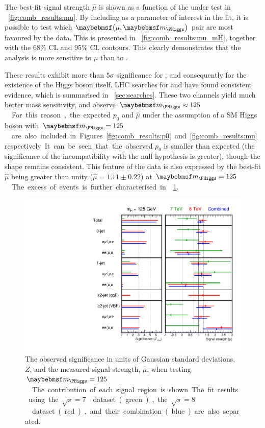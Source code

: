 The best-fit signal strength $\hat{\mu}$ is shown as a function of the \mH under test in 
\Figure~\ref{fig:comb_results:mu}. By including \mH as a parameter of interest in the fit, 
it is possible to test which $\parenths{\mu, \mH}$ pair are most favoured by the data. This 
is presented in \Figure~\ref{fig:comb_results:mu_mH}, together with the 68\% CL and 95\% CL 
contours. This clearly demonstrates that the analysis is more sensitive to $\mu$ than to \mH.

These results exhibit more than $5\sigma$ significance for \HWWlvlv, and consequently for 
the existence of the Higgs boson itself. LHC searches for 
\HepProcess{\PHiggs \HepTo \Pphoton\Pphoton} and \HepProcess{\PHiggs \HepTo \PZ\PZ} have 
found consistent evidence, which is summarised in \Section~\ref{sec:searches}. These two 
channels yield much better mass sensitivity, and observe \unit{$\mH \approx 125$}{\GeV}. 
For this reason, the expected $p_0$ and $\hat{\mu}$ under the assumption of a SM Higgs boson 
with \unit{$\mH = 125$}{\GeV} are also included in Figures~\ref{fig:comb_results:p0} and 
\ref{fig:comb_results:mu} respectively. It can be seen that the observed $p_0$ is smaller 
than expected (\ie the significance of the incompatibility with the null hypothesis is 
greater), though the shape remains consistent. This feature of the data is also expressed by 
the best-fit $\hat{\mu}$ being greater than unity ($\hat{\mu} = 1.11 \pm 0.22$) at 
\unit{$\mH = 125$}{\GeV}. The excess of events is further characterised in 
\Figure~\ref{fig:comb_results:p0_mu_breakdown}.

\begin{figure}[p]
	\includegraphics[width=\hugefigwidth]{custom_images/limits/z_and_mu}
	\caption{The observed significance in units of Gaussian standard deviations, $Z$, and 
	the measured signal strength, $\hat{\mu}$, when testing \unit{$\mH = 125$}{\GeV}. The 
	contribution of each signal region is shown. The fit results using the 
	\unit{$\sqrt{s} = 7$}{\TeV} dataset (green), the \unit{$\sqrt{s} = 8$}{\TeV} dataset 
	(red), and their combination (blue) are also separated.}
	\label{fig:comb_results:p0_mu_breakdown}
\end{figure}


